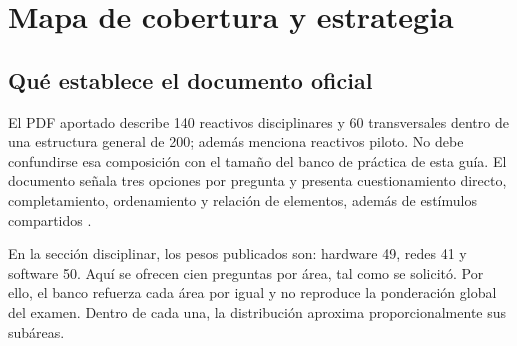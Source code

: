 \chapter{Mapa de cobertura y estrategia}
\section{Qué establece el documento oficial}
El PDF aportado describe 140 reactivos disciplinares y 60 transversales dentro de una estructura general de 200; además menciona reactivos piloto. No debe confundirse esa composición con el tamaño del banco de práctica de esta guía. El documento señala tres opciones por pregunta y presenta cuestionamiento directo, completamiento, ordenamiento y relación de elementos, además de estímulos compartidos \cite[págs. 8--11 y 35--36]{ceneval}.

En la sección disciplinar, los pesos publicados son: hardware 49, redes 41 y software 50. Aquí se ofrecen cien preguntas por área, tal como se solicitó. Por ello, el banco refuerza cada área por igual y no reproduce la ponderación global del examen. Dentro de cada una, la distribución aproxima proporcionalmente sus subáreas.

